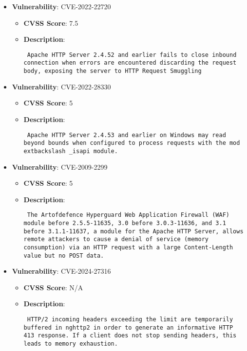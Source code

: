 \documentclass{article}
\begin{document}
\begin{itemize}
        \item \textbf{Vulnerability}: CVE-2022-22720
        \begin{itemize}
            \item \textbf{CVSS Score}:  7.5 
            \item \textbf{Description}: \parbox{\linewidth}{\texttt{ Apache HTTP Server 2.4.52 and earlier fails to close inbound connection when errors are encountered discarding the request body, exposing the server to HTTP Request Smuggling }}
        \end{itemize}
    
        \item \textbf{Vulnerability}: CVE-2022-28330
        \begin{itemize}
            \item \textbf{CVSS Score}:  5 
            \item \textbf{Description}: \parbox{\linewidth}{\texttt{ Apache HTTP Server 2.4.53 and earlier on Windows may read beyond bounds when configured to process requests with the mod	extbackslash _isapi module. }}
        \end{itemize}
    
        \item \textbf{Vulnerability}: CVE-2009-2299
        \begin{itemize}
            \item \textbf{CVSS Score}:  5 
            \item \textbf{Description}: \parbox{\linewidth}{\texttt{ The Artofdefence Hyperguard Web Application Firewall (WAF) module before 2.5.5-11635, 3.0 before 3.0.3-11636, and 3.1 before 3.1.1-11637, a module for the Apache HTTP Server, allows remote attackers to cause a denial of service (memory consumption) via an HTTP request with a large Content-Length value but no POST data. }}
        \end{itemize}
    
        \item \textbf{Vulnerability}: CVE-2024-27316
        \begin{itemize}
            \item \textbf{CVSS Score}:  N/A 
            \item \textbf{Description}: \parbox{\linewidth}{\texttt{ HTTP/2 incoming headers exceeding the limit are temporarily buffered in nghttp2 in order to generate an informative HTTP 413 response. If a client does not stop sending headers, this leads to memory exhaustion. }}
        \end{itemize}
    

\end{itemize}
\end{document}
